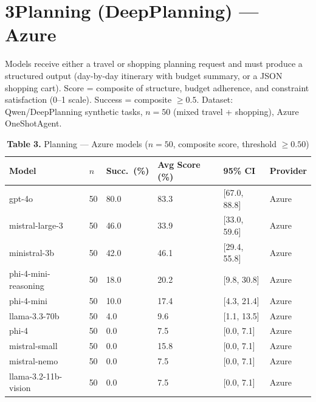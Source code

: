 \documentclass[11pt,letterpaper]{article}
\begin{document}
\newpage

\section*{3\quad Planning (DeepPlanning) --- Azure}

Models receive either a travel or shopping planning request and must produce a structured output (day-by-day itinerary with budget summary, or a JSON shopping cart).
Score = composite of structure, budget adherence, and constraint satisfaction (0--1 scale). Success = composite $\geq 0.5$.
Dataset: Qwen/DeepPlanning synthetic tasks, $n = 50$ (mixed travel + shopping), Azure OneShotAgent.

\vspace{0.3cm}

\begin{table}[h!]
\centering
\caption*{\textbf{Table 3.} Planning --- Azure models ($n=50$, composite score, threshold $\geq 0.50$)}
\begin{tabular}{l R{0.9cm} R{1.8cm} R{2.2cm} R{2.6cm} l}
\toprule
\textbf{Model} & \textbf{$n$} & \textbf{Succ.\ (\%)} & \textbf{Avg Score (\%)} & \textbf{95\% CI} & \textbf{Provider} \\
\midrule
{} gpt-4o              & 50 & 80.0 & 83.3 & [67.0, 88.8] & Azure \\
mistral-large-3     & 50 & 46.0 & 33.9 & [33.0, 59.6] & Azure \\
ministral-3b        & 50 & 42.0 & 46.1 & [29.4, 55.8] & Azure \\
 phi-4-mini-reasoning& 50 & 18.0 & 20.2 & [9.8, 30.8]  & Azure \\
 phi-4-mini          & 50 & 10.0 & 17.4 & [4.3, 21.4]  & Azure \\
 llama-3.3-70b       & 50 &  4.0 &  9.6 & [1.1, 13.5]  & Azure \\
 phi-4               & 50 &  0.0 &  7.5 & [0.0, 7.1]   & Azure \\
 mistral-small       & 50 &  0.0 & 15.8 & [0.0, 7.1]   & Azure \\
 mistral-nemo        & 50 &  0.0 &  7.5 & [0.0, 7.1]   & Azure \\
 llama-3.2-11b-vision& 50 &  0.0 &  7.5 & [0.0, 7.1]   & Azure \\
\bottomrule
\end{tabular}
\end{table}
\end{document}
